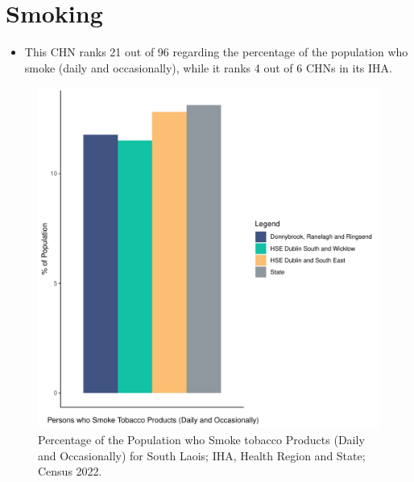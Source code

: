 \documentclass{article}
\begin{document}
\pagebreak

\section{Smoking}\label{sect:Smoking}
\begin{itemize}
\item This CHN ranks  21 out of 96 regarding the percentage of the population who smoke (daily and occasionally), while it ranks   4 out of 6 CHNs in its IHA.
\end{itemize}
\begin{figure}[H]
	\centering
	\includegraphics[width = 120mm]{../figures/SmokingED.pdf}
	\caption{Percentage of the Population who Smoke tobacco Products (Daily and Occasionally) for South Laois; IHA, Health Region and State; Census 2022.}
	\label{fig:2ae19629-1a6a-13a3-e055-000000000001}
	\end{figure}
	
\end{document}
